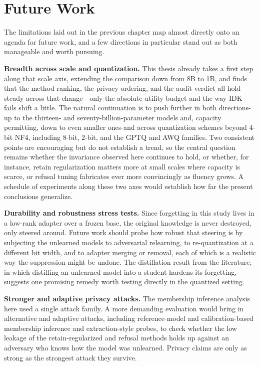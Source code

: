 \documentclass[a4paper,12pt]{report}
\begin{document}
\section{Future Work}
The limitations laid out in the previous chapter map almost directly onto an agenda for future work, and a few directions in particular stand out as both manageable and worth pursuing.

\textbf{Breadth across scale and quantization.} This thesis already takes a first step along that scale axis, extending the comparison down from 8B to 1B, and finds that the method ranking, the privacy ordering, and the audit verdict all hold steady across that change - only the absolute utility budget and the way IDK fails shift a little. The natural continuation is to push further in both directions-up to the thirteen- and seventy-billion-parameter models and, capacity permitting, down to even smaller ones-and across quantization schemes beyond 4-bit NF4, including 8-bit, 2-bit, and the GPTQ and AWQ families. Two consistent points are encouraging but do not establish a trend, so the central question remains whether the invariance observed here continues to hold, or whether, for instance, retain regularization matters more at small scales where capacity is scarce, or refusal tuning fabricates ever more convincingly as fluency grows. A schedule of experiments along these two axes would establish how far the present conclusions generalize.

\textbf{Durability and robustness stress tests.} Since forgetting in this study lives in a low-rank adapter over a frozen base, the original knowledge is never destroyed, only steered around. Future work should probe how robust that steering is by subjecting the unlearned models to adversarial relearning, to re-quantization at a different bit width, and to adapter merging or removal, each of which is a realistic way the suppression might be undone. The distillation result from the literature, in which distilling an unlearned model into a student hardens its forgetting, suggests one promising remedy worth testing directly in the quantized setting.

\textbf{Stronger and adaptive privacy attacks.} The membership inference analysis here used a single attack family. A more demanding evaluation would bring in alternative and adaptive attacks, including reference-model and calibration-based membership inference and extraction-style probes, to check whether the low leakage of the retain-regularized and refusal methods holds up against an adversary who knows how the model was unlearned. Privacy claims are only as strong as the strongest attack they survive.
\end{document}
